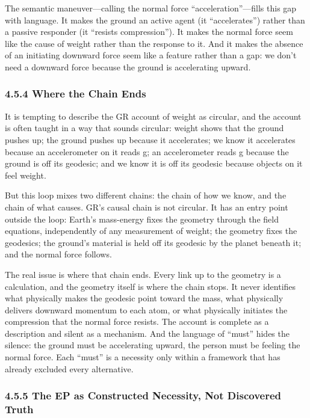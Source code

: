 \documentclass[11pt]{article}
\begin{document}
The semantic maneuver---calling the normal force ``acceleration''---fills this gap with language. It makes the ground an active agent (it ``accelerates'') rather than a passive responder (it ``resists compression''). It makes the normal force seem like the cause of weight rather than the response to it. And it makes the absence of an initiating downward force seem like a feature rather than a gap: we don't need a downward force because the ground is accelerating upward.

\subsubsection{4.5.4 Where the Chain Ends}

It is tempting to describe the GR account of weight as circular, and the account is often taught in a way that sounds circular: weight shows that the ground pushes up; the ground pushes up because it accelerates; we know it accelerates because an accelerometer on it reads g; an accelerometer reads g because the ground is off its geodesic; and we know it is off its geodesic because objects on it feel weight.

But this loop mixes two different chains: the chain of how we know, and the chain of what causes. GR's causal chain is not circular. It has an entry point outside the loop: Earth's mass-energy fixes the geometry through the field equations, independently of any measurement of weight; the geometry fixes the geodesics; the ground's material is held off its geodesic by the planet beneath it; and the normal force follows.

The real issue is where that chain ends. Every link up to the geometry is a calculation, and the geometry itself is where the chain stops. It never identifies what physically makes the geodesic point toward the mass, what physically delivers downward momentum to each atom, or what physically initiates the compression that the normal force resists. The account is complete as a description and silent as a mechanism. And the language of ``must'' hides the silence: the ground must be accelerating upward, the person must be feeling the normal force. Each ``must'' is a necessity only within a framework that has already excluded every alternative.

\subsubsection{4.5.5 The EP as Constructed Necessity, Not Discovered Truth}
\end{document}
